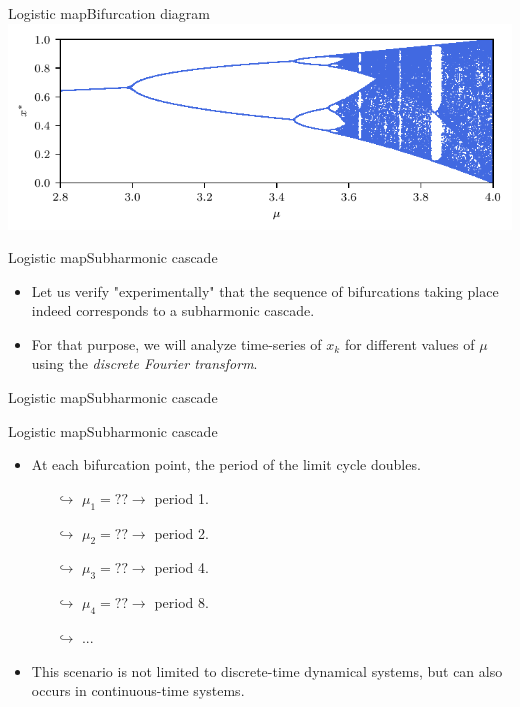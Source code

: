 \documentclass[usenames,dvipsnames,svgnames,10pt,aspectratio=169]{beamer}
\begin{document}
\begin{frame}[t, c]{Logistic map}{Bifurcation diagram}
	\centering
	\includegraphics[width=.75\textwidth]{logistic_map_bifurcation_zoom_1}

	\vspace{1cm}
\end{frame}

\begin{frame}[t, c]{Logistic map}{Subharmonic cascade}
	\begin{itemize}
		\item Let us verify "experimentally" that the sequence of bifurcations taking place indeed corresponds to a subharmonic cascade.

		\bigskip

		\item For that purpose, we will analyze time-series of $x_{k}$ for different values of $\mu$ using the \emph{discrete Fourier transform}.
	\end{itemize}

	\vspace{1cm}
\end{frame}

\begin{frame}[t, c]{Logistic map}{Subharmonic cascade}

\end{frame}

\begin{frame}[t, c]{Logistic map}{Subharmonic cascade}
	\begin{itemize}
		\item At each bifurcation point, the period of the limit cycle doubles.
		\begin{itemize}
			\item[$\hookrightarrow$] $\mu_1 = ?? \to$ period 1.
			\item[$\hookrightarrow$] $\mu_2 = ?? \to$ period 2.
			\item[$\hookrightarrow$] $\mu_3 = ?? \to$ period 4.
			\item[$\hookrightarrow$] $\mu_4 = ?? \to$ period 8.
			\item[$\hookrightarrow$] ...
		\end{itemize}

		\bigskip

		\item This scenario is not limited to discrete-time dynamical systems, but can also occurs in continuous-time systems.
	\end{itemize}

	\vspace{1cm}
\end{frame}
\end{document}

